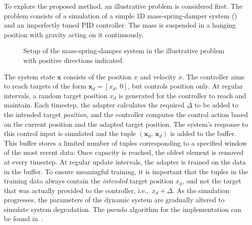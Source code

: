 To explore the proposed method, an illustrative problem is considered first.
The problem consists of a simulation of a simple 1D mass-spring-damper system () and an imperfectly tuned PID controller.
The mass is suspended in a hanging position with gravity acting on it continuously.

\begin{figure}[htb]
    \centering
    \def\svgwidth{0.33\linewidth}
    \small\selectfont
    \caption{Setup of the mass-spring-damper system in the illustrative problem with positive directions indicated.}
    \label{fig:toy-setup}
\end{figure}

The system state $\mathbf{x}$ consists of the position $x$ and velocity $\dot{x}$.
The controller aims to reach targets of the form $\mathbf{x}_d = [x_d,\, 0]$, but controls position only.
At regular intervals, a random target position $x_d$ is generated for the controller to reach and maintain.
Each timestep, the adapter calculates the required $\Delta$ to be added to the intended target \emph{position}, and the controller computes the control action based on the current position and the adapted target position.
The system's response to this control input is simulated and the tuple $(\mathbf{x}_0,\,\mathbf{x}_d)$ is added to the buffer.
This buffer stores a limited number of tuples corresponding to a specified window of the most recent data:
Once capacity is reached, the oldest element is removed at every timestep.
At regular update intervals, the adapter is trained on the data in the buffer.
To ensure meaningful training, it is important that the tuples in the training data always contain the \emph{intended} target position $x_d$, and not the target that was actually provided to the controller, i.e.,~$x_d + \Delta$.
As the simulation progresses, the parameters of the dynamic system are gradually altered to simulate system degradation.
The pseudo algorithm for the implementation can be found in~.

